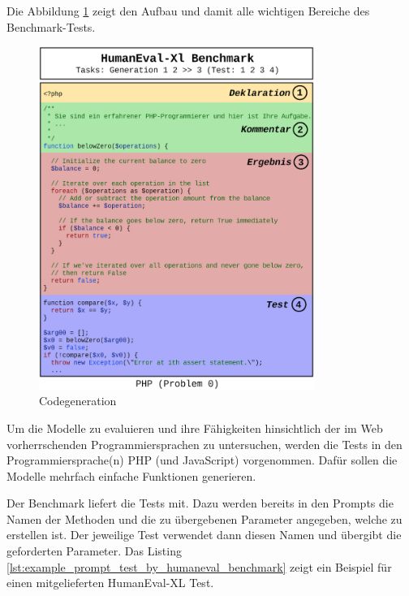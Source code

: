 Die Abbildung \ref{img:code_generation_humaneval} zeigt den Aufbau und damit alle wichtigen Bereiche des Benchmark-Tests.\vspace{0.2cm}

\begin{figure}[!ht]
	\includegraphics[width=0.8\textwidth]{content/chapter_intruduction/images/code_generation_humaneval_x.eps}
	\centering
	\caption{Codegeneration}
	\label{img:code_generation_humaneval}
\end{figure}

Um die Modelle zu evaluieren und ihre Fähigkeiten hinsichtlich der im Web vorherrschenden Programmiersprachen zu untersuchen, werden die Tests in den Programmiersprache(n) PHP (und JavaScript) vorgenommen. Dafür sollen die Modelle mehrfach einfache Funktionen generieren.\vspace{0.2cm}

Der Benchmark liefert die Tests mit. Dazu werden bereits in den Prompts die Namen der Methoden und die zu übergebenen Parameter angegeben, welche zu erstellen ist. Der jeweilige Test verwendet dann diesen Namen und übergibt die geforderten Parameter. Das Listing \ref{lst:example_prompt_test_by_humaneval_benchmark} zeigt ein Beispiel für einen mitgelieferten HumanEval-XL Test.

